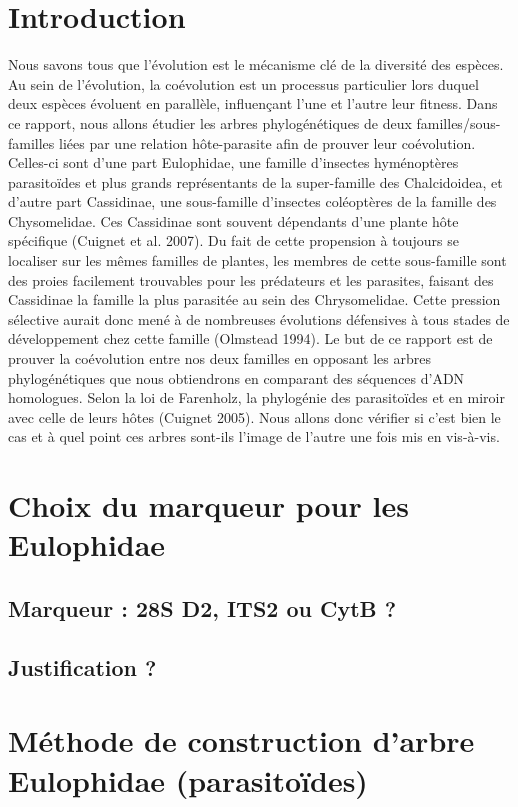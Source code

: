 \documentclass[a4paper, 12pt]{article}
\begin{document}
\section{Introduction}
Nous savons tous que l’évolution est le mécanisme clé de la diversité des espèces. Au sein de l’évolution, la coévolution est un processus particulier lors duquel deux espèces évoluent en parallèle, influençant l’une et l’autre leur fitness. Dans ce rapport, nous allons étudier les arbres phylogénétiques de deux familles/sous-familles liées par une relation hôte-parasite afin de prouver leur coévolution. Celles-ci sont d’une part Eulophidae, une famille d’insectes hyménoptères parasitoïdes et plus grands représentants de la super-famille des Chalcidoidea, et d’autre part Cassidinae, une sous-famille d’insectes coléoptères de la famille des Chysomelidae. Ces Cassidinae sont souvent dépendants d’une plante hôte spécifique (Cuignet et al. 2007). Du fait de cette propension à toujours se localiser sur les mêmes familles de plantes, les membres de cette sous-famille sont des proies facilement trouvables pour les prédateurs et les parasites, faisant des Cassidinae la famille la plus parasitée au sein des Chrysomelidae. Cette pression sélective aurait donc mené à de nombreuses évolutions défensives à tous stades de développement chez cette famille (Olmstead 1994).
Le but de ce rapport est de prouver la coévolution entre nos deux familles en opposant les arbres phylogénétiques que nous obtiendrons en comparant des séquences d’ADN homologues. Selon la loi de Farenholz, la phylogénie des parasitoïdes et en miroir avec celle de leurs hôtes (Cuignet 2005). Nous allons donc vérifier si c’est bien le cas et à quel point ces arbres sont-ils l’image de l’autre une fois mis en vis-à-vis.


\section{Choix du marqueur pour les Eulophidae}

\subsection{Marqueur : 28S D2, ITS2 ou CytB ?} 

\subsection{Justification ?}

\section{Méthode de construction d'arbre Eulophidae (parasitoïdes)}
\end{document}
